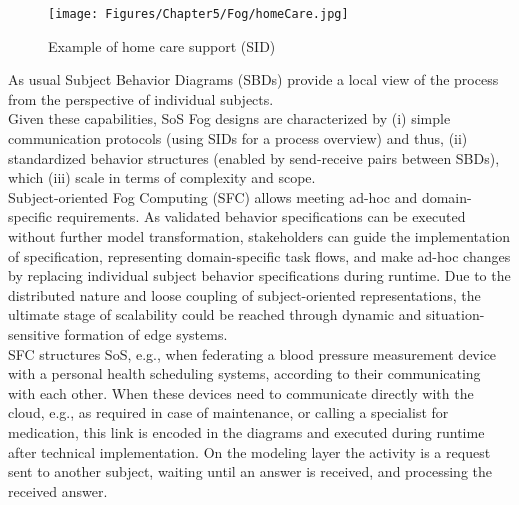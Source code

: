 \begin{figure}[htbp]
	\centering
	\texttt{[image: Figures/Chapter5/Fog/homeCare.jpg]}
	\caption[Example of home care support (SID)]{Example of home care support (SID)}
	\label{fig:homeCare}
\end{figure}


As usual Subject Behavior Diagrams (SBDs) provide a local view of the process from the perspective of individual subjects.
\\
Given these capabilities, SoS Fog designs are characterized by (i) simple communication protocols (using SIDs for a process overview) and thus, (ii) standardized behavior structures (enabled by send-receive pairs between SBDs), which (iii) scale in terms of complexity and scope.
\\
Subject-oriented Fog Computing (SFC) allows meeting ad-hoc and domain-specific requirements. As validated behavior specifications can be executed without further model transformation, stakeholders can guide the implementation of specification, representing domain-specific task flows, and make ad-hoc changes by replacing individual subject behavior specifications during runtime. Due to the distributed nature and loose coupling of subject-oriented representations, the ultimate stage of scalability could be reached through dynamic and situation-sensitive formation of edge systems.
\\
SFC structures SoS, e.g., when federating a blood pressure measurement device with a personal health scheduling systems, according to their communicating with each other. When these devices need to communicate directly with the cloud, e.g., as required in case of maintenance, or calling a specialist for medication, this link is encoded in the diagrams and executed during runtime after technical implementation. On the modeling layer the activity is a request sent to another subject, waiting until an answer is received, and processing the received answer.

